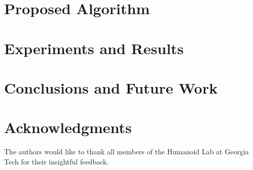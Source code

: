 \documentclass[conference]{IEEEtran}
\begin{document}
\section{Proposed Algorithm}
\label{sec:ProposedAlgorithm}


\section{Experiments and Results}
\label{sec:Experiments}


\section{Conclusions and Future Work}
\label{sec:Conclusions}


\section*{Acknowledgments}
The authors would like to thank all members of the Humanoid Lab
at Georgia Tech for their insightful feedback.



\end{document}
